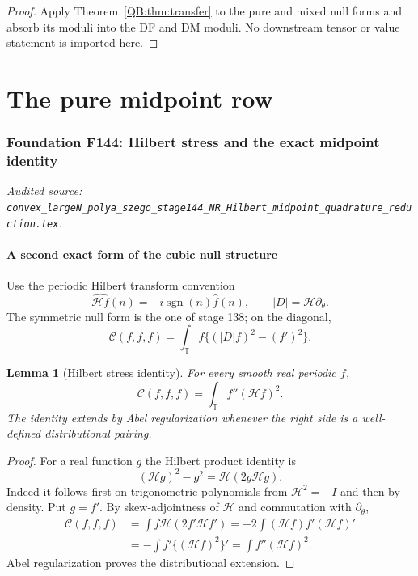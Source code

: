\documentclass[11pt]{amsart}
\numberwithin{equation}{section}
\newtheorem{lemma}[theorem]{Lemma}
\theoremstyle{definition}
\theoremstyle{remark}
\newcommand{\T}{\mathbb T}
\newcommand{\Hil}{\mathcal H}
\newcommand{\Cnull}{\mathcal C}
\begin{document}
\begin{proof}
Apply Theorem~\ref{QB:thm:transfer} to the pure and mixed null forms and absorb
its moduli into the DF and DM moduli.  No downstream tensor or value
statement is imported here.
\end{proof}
\endgroup


\part{The pure midpoint row}

\begingroup
\section{Foundation F144: Hilbert stress and the exact midpoint identity}
\label{module:F144}
\noindent\textit{Audited source: \nolinkurl{convex_largeN_polya_szego_stage144_NR_Hilbert_midpoint_quadrature_reduction.tex}.}
\subsection{A second exact form of the cubic null structure}

Use the periodic Hilbert transform convention
\begin{equation}\label{F144:eq:H}
 \widehat{\Hil f}(n)=-i\operatorname {sgn}(n)\widehat f(n),
 \qquad |D|=\Hil\partial_\theta.
\end{equation}
The symmetric null form is the one of stage 138; on the diagonal,
\begin{equation}\label{F144:eq:C}
 \Cnull(f,f,f)=\int_\T f\{(|D|f)^2-(f')^2\}.
\end{equation}

\begin{lemma}[Hilbert stress identity]
\label{F144:lem:stress}
For every smooth real periodic $f$,
\begin{equation}\label{F144:eq:stress}
 \boxed{\Cnull(f,f,f)=\int_\T f''(\Hil f)^2.}
\end{equation}
The identity extends by Abel regularization whenever the right side is a
well-defined distributional pairing.
\end{lemma}

\begin{proof}
For a real function $g$ the Hilbert product identity is
\begin{equation}\label{F144:eq:product}
 (\Hil g)^2-g^2=\Hil(2g\Hil g).
\end{equation}
Indeed it follows first on trigonometric polynomials from
$\Hil^2=-I$ and then by density.  Put $g=f'$.  By skew-adjointness of
$\Hil$ and commutation with $\partial_\theta$,
\begin{align*}
 \Cnull(f,f,f)
 &=\int f\Hil(2f'\Hil f')
 =-2\int (\Hil f)f'(\Hil f)'\\
 &=-\int f'\{(\Hil f)^2\}'
 =\int f''(\Hil f)^2.
\end{align*}
Abel regularization proves the distributional extension.
\end{proof}
\end{document}
